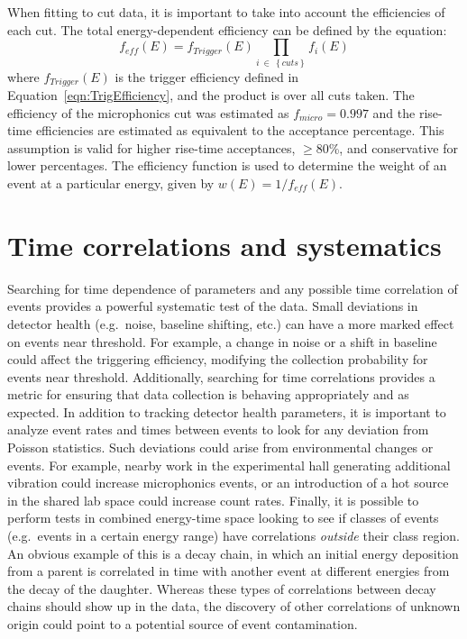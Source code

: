 	When fitting to cut data, it is important to take into account the efficiencies of each cut.  The total energy-dependent efficiency can be defined by the equation:
		\begin{equation}
		f_{eff}(E) = f_{Trigger}(E) \prod_{i~\in~\left\{cuts\right\}} f_{i}(E)		
		\label{eqn:EfficiencyEquation}
		\end{equation}
where $f_{Trigger}(E)$ is the trigger efficiency defined in Equation~\ref{eqn:TrigEfficiency}, and the product is over all cuts taken.  The efficiency of the microphonics cut was estimated as $f_{micro} = 0.997$ and the rise-time efficiencies are estimated as equivalent to the acceptance percentage.  This assumption is valid for higher rise-time acceptances, $\ge80$\%, and conservative for lower percentages.  The efficiency function is used to determine the weight of an event at a particular energy, given by $w(E) = 1/f_{eff}(E)$.

	\section{Time correlations and systematics}
	\label{sec:BeGeTimeCorrelations}

	Searching for time dependence of parameters and any possible time correlation of events provides a powerful systematic test of the data.  Small deviations in detector health (e.g.~noise, baseline shifting, etc.) can have a more marked effect on events near threshold.  For example, a change in noise or a shift in baseline could affect the triggering efficiency, modifying the collection probability for events near threshold.  Additionally, searching for time correlations provides a metric for ensuring that data collection is behaving appropriately and as expected.  In addition to tracking detector health parameters, it is important to analyze event rates and times between events to look for any deviation from Poisson statistics.  Such deviations could arise from environmental changes or events.  For example, nearby work in the experimental hall generating additional vibration could increase microphonics events, or an introduction of a hot source in the shared lab space could increase count rates.  Finally, it is possible to perform tests in combined energy-time space looking to see if classes of events (e.g.~events in a certain energy range) have correlations \emph{outside} their class region.  An obvious example of this is a decay chain, in which an initial energy deposition from a parent is correlated in time with another event at different energies from the decay of the daughter.  Whereas these types of correlations between decay chains should show up in the data, the discovery of other correlations of unknown origin could point to a potential source of event contamination.  
	
